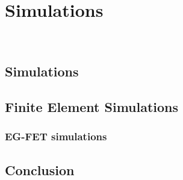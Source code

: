 \chapter{Simulations}
\label{cap:chapter5}

\newpage
\thispagestyle{empty}
\ %
\newpage


\section{Simulations}
\label{sec:simulations}


\section{Finite Element Simulations}
\label{sec:finite_element}


\subsection{EG-FET simulations}
\label{sec:EGFET_simulations}


\section{Conclusion}


\newpage
\thispagestyle{empty}
\ %
\newpage